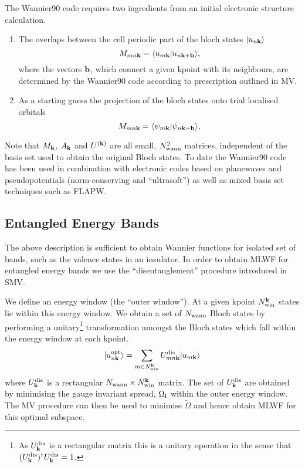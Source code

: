 The Wannier90 code requires two ingredients from an initial electronic structure calculation.
\begin{enumerate}
\item The overlaps between the cell periodic part of the bloch states $|u_{n{\bf k}}\rangle$ 
\begin{equation}
M_{mn{\bf k}}=\langle u_{m{\bf k}}|u_{n{\bf k}+{\bf b}}\rangle,
\end{equation}
where the vectors ${\bf b}$, which connect a given kpoint with its neighbours, are determined
by the Wannier90 code according to prescription outlined in MV.
\item As a starting guess the projection of the bloch states onto trial localised orbitals 
\begin{equation}
M_{mn{\bf k}}=\langle \psi_{m{\bf k}}|\psi_{n{\bf k}+{\bf b}}\rangle,
\end{equation}
\end{enumerate}
Note that $M_{{\bf k}}$, $A_{{\bf k}}$ and $U^{({\bf k})}$ are all
small, $N_{{\rm wann}}^2$ matrices, independent of the basis set used to
obtain the original Bloch states. To date the Wannier90 code has been
used in combination with electronic codes based on planewaves and
pseudopotentials (norm-conserving and ``ultrasoft'') as well as mixed
basis set techniques such as FLAPW. 

\subsection{Entangled Energy Bands}
The above description is sufficient to obtain Wannier functions for
isolated set of bands, such as the valence states in an insulator. In
order to obtain MLWF for entangled energy bands we use the
``disentanglement'' procedure introduced in SMV.

We define an energy window (the ``outer window''). At a given kpoint 
$N^{{\bf k}}_{{\rm win}}$ states lie within this energy window. We obtain a set of
$N_{{\rm wann}}$ Bloch states by performing a unitary\footnote{As
    $U^{{\rm dis}}_{{\bf k}}$ is a rectangular matrix this is a unitary
    operation in the sense that $(U^{{\rm dis}}_{{\bf
        k}})^{\dagger}U^{{\rm dis}}_{{\bf k}}=1$.}
transformation amongst the Bloch states which fall within the energy window at each kpoint.
 \begin{equation}
| u_{n{\bf k}}^{{\rm opt}}\rangle = \sum_{m\in N^{{\bf k}}_{{\rm win}}}
U^{{\rm dis}}_{mn{\bf k}} | u_{m{\bf k}}\rangle
\end{equation}
where $U^{{\rm dis}}_{{\bf k}}$ is a rectangular $N_{{\rm wann}}\times N^{{\bf
 k}}_{{\rm win}}$
 matrix. The set of $U^{{\rm dis}}_{{\bf k}}$ are obtained by minimising
 the gauge invariant spread, $\Omega_{{\rm I}}$ within the outer energy
 window. The MV procedure can then be used to minimise $\tilde{\Omega}$
 and hence obtain MLWF for this optimal subspace.


